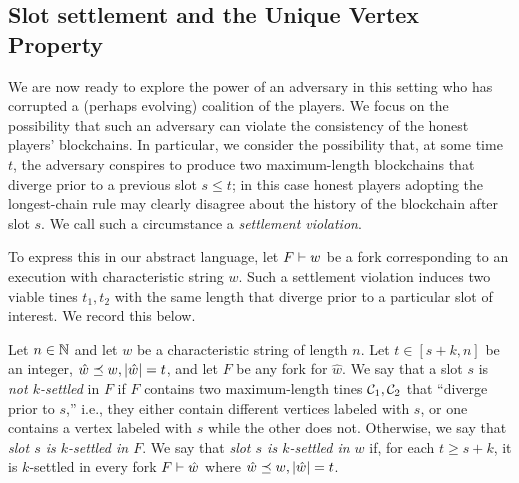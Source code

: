 

\subsection{Slot settlement and the Unique Vertex Property}\label{sec:model-settlement}
  
  We are now ready to explore the power of an adversary in this
  setting who has corrupted a (perhaps evolving) coalition of the
  players. We focus on the possibility that such an adversary can
  violate the consistency of the honest players'
  blockchains. In particular, we consider the possibility that, at
  some time $t$, the adversary conspires to produce two maximum-length blockchains 
  that diverge prior to a previous slot $s \leq t$; in
  this case honest players adopting the longest-chain rule may clearly
  disagree about the history of the blockchain after slot $s$. We call
  such a circumstance a \emph{settlement violation}.

  To express this in our abstract language, let $F \vdash w$ be a fork
  corresponding to an execution with characteristic string $w$. Such a
  settlement violation induces two viable tines $t_1, t_2$ with the
  same length that diverge prior to a particular slot of interest. We
  record this below.
    
  \begin{definition}\label{def:settlement-mh}
    Let $n \in \mathbb{N}$ and let $w$ be a characteristic string of length $n$. 
    Let $t \in [s + k, n]$ be an integer, $\hat{w} \preceq w, |\hat{w}| = t$, and 
    let $F$ be any fork for $\hat{w}$. 
    We say that a slot $s$ is \emph{not $k$-settled} in $F$ if 
    $F$ contains two maximum-length tines $\mathcal{C}_1, \mathcal{C}_2$ 
    that ``diverge prior to $s$,'' i.e., they either
    contain different vertices labeled with $s$, or one contains a
    vertex labeled with $s$ while the other does not. 
    Otherwise, we say that \emph{slot $s$ is $k$-settled in $F$}. 
    We say that \emph{slot $s$ is $k$-settled in $w$} if, 
    for each $t \geq s+k$, 
    it is $k$-settled in every fork $F \vdash \hat{w}$ where $\hat{w} \preceq w, |\hat{w}| = t$.
  \end{definition}




